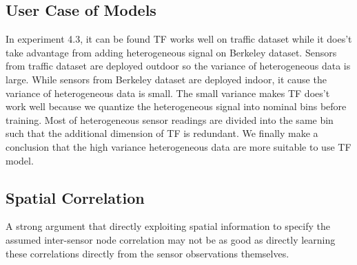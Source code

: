 \subsection{User Case of Models}
In experiment 4.3, it can be found TF works well on traffic dataset while it does't take advantage from adding heterogeneous signal on Berkeley dataset.
Sensors from traffic dataset are deployed outdoor so the variance of heterogeneous data is large.
While sensors from Berkeley dataset are deployed indoor, it cause the variance of heterogeneous data is small.
The small variance makes TF does't work well because we quantize the heterogeneous signal into nominal bins before training.
Most of heterogeneous sensor readings are divided into the same bin such that the additional dimension of TF is redundant.
We finally make a conclusion that the high variance heterogeneous data are more suitable to use TF model.

\subsection{Spatial Correlation}
A strong argument that directly exploiting spatial information to specify the assumed inter-sensor node correlation may not be as good as directly learning these correlations directly from the sensor observations themselves.
